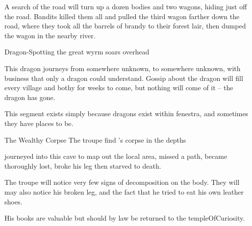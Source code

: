 \begin{multicols}{2}
A search of the road will turn up a dozen bodies and two wagons, hiding just off the road.
Bandits killed them all and pulled the third wagon farther down the road, where they took all the barrels of brandy to their forest lair, then dumped the wagon in the nearby river.


{Dragon-Spotting}%
{the great wyrm soars overhead}%

This dragon journeys from somewhere unknown, to somewhere unknown, with business that only a dragon could understand.
Gossip about the dragon will fill every \gls{village} and \gls{bothy} for weeks to come, but nothing will come of it -- the dragon has gone.

This \gls{segment} exists simply because dragons exist within \gls{fenestra}, and sometimes they have places to be.

{The Wealthy Corpse}%
{The troupe find 's corpse in the depths}%

\begin{exampletext}
   journeyed into this cave to map out the local area, missed a path, became thoroughly lost, broke his leg then starved to death.
\end{exampletext}

The troupe will notice very few signs of decomposition on the body.
They will may also notice his broken leg, and the fact that he tried to eat his own leather shoes.

His books are valuable but should by law be returned to the \gls{templeOfCuriosity}.

\stopcontents[sq]

\end{multicols}
